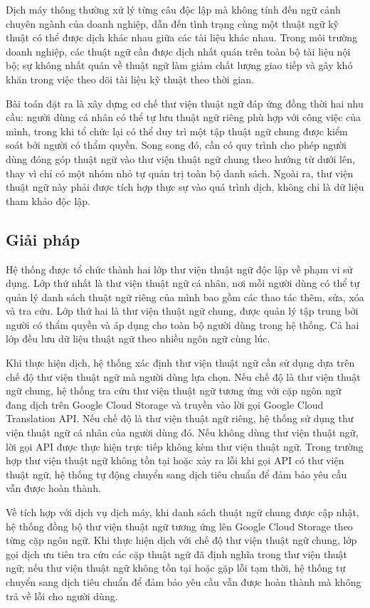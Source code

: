 \documentclass[../DoAn.tex]{subfiles}
\begin{document}
Dịch máy thông thường xử lý từng câu độc lập mà không tính đến ngữ cảnh chuyên ngành của doanh nghiệp, dẫn đến tình trạng cùng một thuật ngữ kỹ thuật có thể được dịch khác nhau giữa các tài liệu khác nhau. Trong môi trường doanh nghiệp, các thuật ngữ cần được dịch nhất quán trên toàn bộ tài liệu nội bộ; sự không nhất quán về thuật ngữ làm giảm chất lượng giao tiếp và gây khó khăn trong việc theo dõi tài liệu kỹ thuật theo thời gian.

Bài toán đặt ra là xây dựng cơ chế thư viện thuật ngữ đáp ứng đồng thời hai nhu cầu: người dùng cá nhân có thể tự lưu thuật ngữ riêng phù hợp với công việc của mình, trong khi tổ chức lại có thể duy trì một tập thuật ngữ chung được kiểm soát bởi người có thẩm quyền. Song song đó, cần có quy trình cho phép người dùng đóng góp thuật ngữ vào thư viện thuật ngữ chung theo hướng từ dưới lên, thay vì chỉ có một nhóm nhỏ tự quản trị toàn bộ danh sách. Ngoài ra, thư viện thuật ngữ này phải được tích hợp thực sự vào quá trình dịch, không chỉ là dữ liệu tham khảo độc lập.

\subsection{Giải pháp}

Hệ thống được tổ chức thành hai lớp thư viện thuật ngữ độc lập về phạm vi sử dụng. Lớp thứ nhất là thư viện thuật ngữ cá nhân, nơi mỗi người dùng có thể tự quản lý danh sách thuật ngữ riêng của mình bao gồm các thao tác thêm, sửa, xóa và tra cứu. Lớp thứ hai là thư viện thuật ngữ chung, được quản lý tập trung bởi người có thẩm quyền và áp dụng cho toàn bộ người dùng trong hệ thống. Cả hai lớp đều lưu dữ liệu thuật ngữ theo nhiều ngôn ngữ cùng lúc.

Khi thực hiện dịch, hệ thống xác định thư viện thuật ngữ cần sử dụng dựa trên chế độ thư viện thuật ngữ mà người dùng lựa chọn. Nếu chế độ là thư viện thuật ngữ chung, hệ thống tra cứu thư viện thuật ngữ tương ứng với cặp ngôn ngữ đang dịch trên Google Cloud Storage và truyền vào lời gọi Google Cloud Translation API. Nếu chế độ là thư viện thuật ngữ riêng, hệ thống sử dụng thư viện thuật ngữ cá nhân của người dùng đó. Nếu không dùng thư viện thuật ngữ, lời gọi API được thực hiện trực tiếp không kèm thư viện thuật ngữ. Trong trường hợp thư viện thuật ngữ không tồn tại hoặc xảy ra lỗi khi gọi API có thư viện thuật ngữ, hệ thống tự động chuyển sang dịch tiêu chuẩn để đảm bảo yêu cầu vẫn được hoàn thành.

Về tích hợp với dịch vụ dịch máy, khi danh sách thuật ngữ chung được cập nhật, hệ thống đồng bộ thư viện thuật ngữ tương ứng lên Google Cloud Storage theo từng cặp ngôn ngữ. Khi thực hiện dịch với chế độ thư viện thuật ngữ chung, lớp gọi dịch ưu tiên tra cứu các cặp thuật ngữ đã định nghĩa trong thư viện thuật ngữ; nếu thư viện thuật ngữ không tồn tại hoặc gặp lỗi tạm thời, hệ thống tự chuyển sang dịch tiêu chuẩn để đảm bảo yêu cầu vẫn được hoàn thành mà không trả về lỗi cho người dùng.
\end{document}
